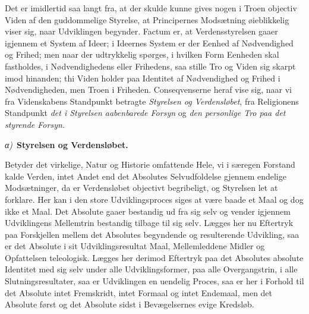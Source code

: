 \documentclass[12pt]{book}
\newcommand{\greekrun}[2]{%
  \medskip\begin{center}{\itshape #1)}\ {\bfseries #2}\end{center}\medskip}
\begin{document}
Det er imidlertid saa langt fra, at der skulde kunne gives nogen i
Troen objectiv Viden af den guddommelige Styrelse, at Principernes
Modsætning øieblikkelig viser sig, naar Udviklingen begynder. Factum
er, at Verdensstyrelsen gaaer igjennem et System af Ideer; i Ideernes
System er der Eenhed af Nødvendighed og Frihed; men naar der
udtrykkelig spørges, i hvilken Form Eenheden skal fastholdes, i
Nødvendighedens eller Frihedens, saa stille Tro og Viden sig skarpt
imod hinanden; thi Viden holder paa Identitet af Nødvendighed og
Frihed i Nødvendigheden, men Troen i Friheden. Conseqvenserne heraf
vise sig, naar vi fra Videnskabens Standpunkt betragte
\emph{Styrelsen og Verdensløbet}, fra Religionens Standpunkt
\emph{det i Styrelsen aabenbarede Forsyn} og \emph{den personlige
Tro paa det styrende Forsyn.}

\greekrun{α}{Styrelsen og Verdensløbet.}

Betyder det virkelige, Natur og Historie omfattende Hele, vi i
særegen Forstand kalde Verden, intet Andet end det Absolutes
Selvudfoldelse gjennem endelige Modsætninger, da er Verdensløbet
objectivt begribeligt, og Styrelsen let at forklare. Her kan i den
store Udviklingsproces siges at være baade et Maal og dog ikke et
Maal. Det Absolute gaaer bestandig ud fra sig selv og vender
igjennem Udviklingens Mellemtrin bestandig tilbage til sig selv.
Lægges her nu Eftertryk paa Forskjellen mellem det Absolutes
begyndende og resulterende Udvikling, saa er det Absolute i sit
Udviklingsresultat Maal, Mellemleddene Midler og Opfattelsen
teleologisk. Lægges her derimod Eftertryk paa det Absolutes absolute
Identitet
med sig selv under alle Udviklingsformer, paa alle Overgangstrin, i
alle Slutningsresultater, saa er Udviklingen en uendelig Proces, saa
er her i Forhold til det Absolute intet Fremskridt, intet Formaal og
intet Endemaal, men det Absolute først og det Absolute sidst i
Bevægelsernes evige Kredsløb.
\end{document}
